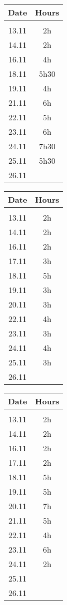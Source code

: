 \vspace{0.5cm}
\begin{tabular}[H]{c|c}
	Date & Hours\\
	\hline\\
	13.11	&	2h\\
	14.11	&	2h\\
	16.11	&	4h\\
	18.11	&	5h30\\
	19.11	&	4h\\
	21.11	&	6h\\
	22.11	&	5h\\
	23.11	&	6h\\
	24.11	&	7h30\\
	25.11	&	5h30\\
	26.11	&	
\end{tabular}

\vspace{0.5cm}
\begin{tabular}[H]{c|c}
	Date & Hours\\
	\hline\\
	13.11	&	2h\\
	14.11	&	2h\\
	16.11	&	2h\\
	17.11	&	3h\\
	18.11	&	5h\\
	19.11	&	3h\\
	20.11	&	3h\\
	22.11	&	4h\\
	23.11	&	3h\\
	24.11	&	4h\\
	25.11	&	3h\\
	26.11	&	
\end{tabular}

\vspace{0.5cm}
\begin{tabular}[H]{c|c}
	Date & Hours\\
	\hline\\
	13.11	&	2h\\
	14.11	&	2h\\
	16.11	&	2h\\
	17.11	&	2h\\
	18.11	&	5h\\
	19.11	&	5h\\
	20.11	&	7h\\
	21.11	&	5h\\
	22.11	&	4h\\
	23.11	&	6h\\
	24.11	&	2h\\
	25.11	&	\\
	26.11	&	
\end{tabular}